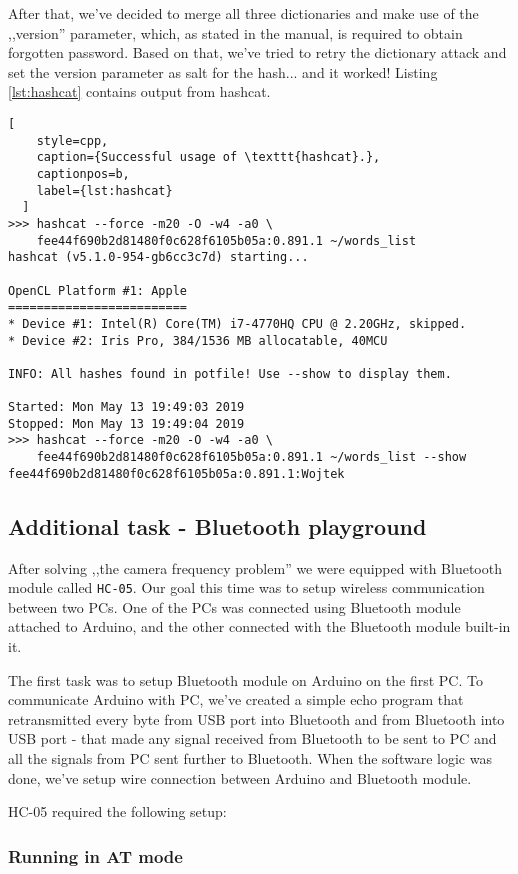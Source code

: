 After that, we've decided to merge all three dictionaries and make use of the ,,version'' parameter, which, as stated in the manual, is required to obtain forgotten password. Based on that, we've tried to retry the dictionary attack and set the version parameter as salt for the hash... and it worked! Listing \ref{lst:hashcat} contains output from hashcat.

\begin{minipage}{\linewidth}
  \begin{lstlisting}[
    style=cpp,
    caption={Successful usage of \texttt{hashcat}.},
    captionpos=b,
    label={lst:hashcat}
  ]
>>> hashcat --force -m20 -O -w4 -a0 \
    fee44f690b2d81480f0c628f6105b05a:0.891.1 ~/words_list
hashcat (v5.1.0-954-gb6cc3c7d) starting...

OpenCL Platform #1: Apple
=========================
* Device #1: Intel(R) Core(TM) i7-4770HQ CPU @ 2.20GHz, skipped.
* Device #2: Iris Pro, 384/1536 MB allocatable, 40MCU

INFO: All hashes found in potfile! Use --show to display them.

Started: Mon May 13 19:49:03 2019
Stopped: Mon May 13 19:49:04 2019
>>> hashcat --force -m20 -O -w4 -a0 \
    fee44f690b2d81480f0c628f6105b05a:0.891.1 ~/words_list --show
fee44f690b2d81480f0c628f6105b05a:0.891.1:Wojtek
  \end{lstlisting}
  \end{minipage}



\subsection{Additional task - Bluetooth playground}

After solving ,,the camera frequency problem'' we were equipped with Bluetooth module called \texttt{HC-05}. Our goal this time was to setup wireless communication between two PCs. One of the PCs was connected using Bluetooth module attached to Arduino, and the other connected with the Bluetooth module built-in it.

The first task was to setup Bluetooth module on Arduino on the first PC. To communicate Arduino with PC, we've created a simple echo program that retransmitted every byte from USB port into Bluetooth and from Bluetooth into USB port - that made any signal received from Bluetooth to be sent to PC and all the signals from PC sent further to Bluetooth. When the software logic was done, we've setup wire connection between Arduino and Bluetooth module.

HC-05 required the following setup:

\subsubsection{Running in AT mode}
